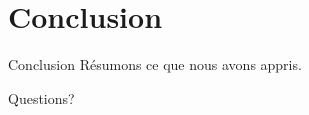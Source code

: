 \documentclass{beamer}
\begin{document}
\section{Conclusion}
\begin{frame}{Conclusion}
	Résumons ce que nous avons appris.
\end{frame}

\begin{frame}[standout]
	Questions?
\end{frame}
	
\end{document}
